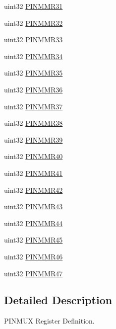 \begin{DoxyCompactItemize}
uint32 \mbox{\hyperlink{structpinMuxBase_ae1b37ac0f0e9d2ed8e07e606521feea1}{P\+I\+N\+M\+M\+R31}}
\item 
uint32 \mbox{\hyperlink{structpinMuxBase_a5e91b5e0b005e2b4cc901133b7cd6232}{P\+I\+N\+M\+M\+R32}}
\item 
uint32 \mbox{\hyperlink{structpinMuxBase_a49a986ceb9c9d3d283b78234cb3c6e8d}{P\+I\+N\+M\+M\+R33}}
\item 
uint32 \mbox{\hyperlink{structpinMuxBase_af8f676ba34c9cecece1c150aa07aa110}{P\+I\+N\+M\+M\+R34}}
\item 
uint32 \mbox{\hyperlink{structpinMuxBase_ae7f016592bf9320e2ed29c79c144d285}{P\+I\+N\+M\+M\+R35}}
\item 
uint32 \mbox{\hyperlink{structpinMuxBase_a86cf3592391fe6d66f4d8f76ffdda28d}{P\+I\+N\+M\+M\+R36}}
\item 
uint32 \mbox{\hyperlink{structpinMuxBase_a75ae9c341ded50851e13113e7732390a}{P\+I\+N\+M\+M\+R37}}
\item 
uint32 \mbox{\hyperlink{structpinMuxBase_af9a1a1d08cd8a62372b162bfa58a3b75}{P\+I\+N\+M\+M\+R38}}
\item 
uint32 \mbox{\hyperlink{structpinMuxBase_ab6c3391a4fe74950ae51f740f4acc474}{P\+I\+N\+M\+M\+R39}}
\item 
uint32 \mbox{\hyperlink{structpinMuxBase_abe006ff9bd65ee037dd054934aa99ea5}{P\+I\+N\+M\+M\+R40}}
\item 
uint32 \mbox{\hyperlink{structpinMuxBase_a29de50e3764400ea21083f9e30befa28}{P\+I\+N\+M\+M\+R41}}
\item 
uint32 \mbox{\hyperlink{structpinMuxBase_ac1a333ae48738ebc37e0104dcb2db086}{P\+I\+N\+M\+M\+R42}}
\item 
uint32 \mbox{\hyperlink{structpinMuxBase_abade43e06cdb853d1a8c470ef3425192}{P\+I\+N\+M\+M\+R43}}
\item 
uint32 \mbox{\hyperlink{structpinMuxBase_ac6647f052191bc005a8ab4d06ba71e13}{P\+I\+N\+M\+M\+R44}}
\item 
uint32 \mbox{\hyperlink{structpinMuxBase_a3b3622849e0911d23e805d65ef9f0b40}{P\+I\+N\+M\+M\+R45}}
\item 
uint32 \mbox{\hyperlink{structpinMuxBase_a62f55a4ff76d058d8a15eb7dd7051eab}{P\+I\+N\+M\+M\+R46}}
\item 
uint32 \mbox{\hyperlink{structpinMuxBase_a7ffd2b02d8ccd6b070ee508d5af04746}{P\+I\+N\+M\+M\+R47}}
\end{DoxyCompactItemize}


\subsection{Detailed Description}
P\+I\+N\+M\+UX Register Definition. 

